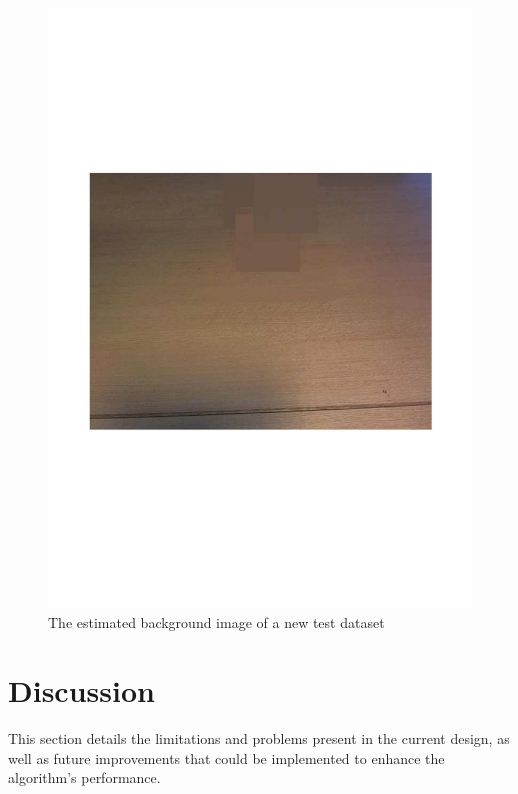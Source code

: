 \documentclass{article}
\begin{document}
\begin{figure}[h!]
\begin{minipage}[b]{0.5\linewidth}
\includegraphics[scale=0.3]{../Drawings/backdata10.pdf}
\caption{The estimated background image of a new test dataset}
\label{fig:backdata10}
\end{minipage}
\end{figure}



\section{Discussion}
\label{sec:discussion}
This section details the limitations and problems present in the current design, as well as future improvements that could be implemented to enhance the algorithm's performance.
\end{document}
